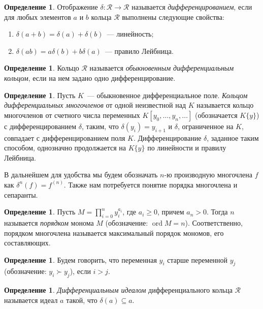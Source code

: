 \documentclass[16pt]{article}
\DeclareMathOperator{\ord}{ord}
\renewcommand{\ge}{\geqslant} %
\theoremstyle{plain1}
\theoremstyle{plain2}
\theoremstyle{plain}
\theoremstyle{plain3}
\theoremstyle{definition}
\newtheorem{definition}[theorem2]{Определение}
\theoremstyle{remark}
\begin{document}
\begin{definition}
Отображение $\delta: \mathcal{R} \to \mathcal{R}$ называется \emph{дифференцированием}, если для любых элементов $a$ и $b$ кольца $\mathcal{R}$
выполнены следующие свойства:
\begin{enumerate}
  \item $\delta(a+b)= \delta(a)+\delta(b)$~--– линейность;
  \item $\delta(ab)=a\delta(b)+b\delta(a)$~--- правило Лейбница.
\end{enumerate}
\end{definition}

\begin{definition}
Кольцо $\mathcal{R}$ называется \emph{обыкновенным дифференциальным кольцом}, если на нем задано одно дифференцирование.
\end{definition}

\begin{definition}
Пусть $K$~--- обыкновенное дифференциальное поле.
\emph{Кольцом дифференциальных многочленов} от одной неизвестной над $K$
называется кольцо многочленов от счетного числа переменных ${K}[y_0,\ldots,y_n,\ldots]$
(обозначается ${K}\{y\}$)
с дифференцированием $\delta$, таким, что $\delta(y_i)=y_{i+1}$ и $\delta$, ограниченное на ${K}$, совпадает с дифференцированием поля $K$. Дифференцирование $\delta$, заданное таким способом, однозначно продолжается на $K\{y\}$ по линейности и правилу Лейбница.
\end{definition}

В дальнейшем для удобства мы будем обозначать $n$-ю производную многочлена $f$ как $\delta^n(f)=f^{(n)}$. Также нам потребуется понятие порядка многочлена и сепаранты.

\begin{definition}
Пусть $M = \prod\limits_{i=0}^ny_i^{a_i}$, где $a_i \ge 0$, причем $a_n > 0$. Тогда $n$ называется \emph{порядком} монома $M$ (обозначение: $\ord M=n$). Соответственно, порядком многочлена называется максимальный порядок
мономов, его составляющих.
\end{definition}

\begin{definition}
Будем говорить, что переменная $y_i$ старше переменной $y_j$ (обозначение: $y_i \succ y_j$), если $i>j$.
\end{definition}

\begin{definition}
\emph{Дифференциальным идеалом} дифференциального кольца $\mathcal{R}$ называется идеал $a$ такой, что $\delta(a)\subseteq a$.
\end{definition}
\end{document}
